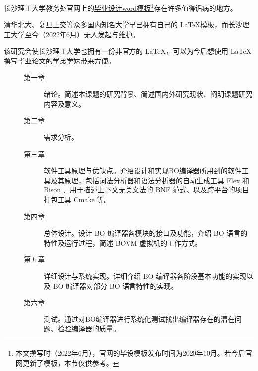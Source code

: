 
长沙理工大学教务处官网上的\href{https://www.csust.edu.cn/jwc/sjjx/bysj.htm}{毕业设计word模板}\footnote{本文撰写时（2022年6月），官网的毕设模板发布时间为2020年10月。若今后官网更新了模板，本节仅供参考。}存在许多值得诟病的地方。


清华北大、复旦上交等众多国内知名大学早已拥有自己的 \LaTeX 模板，而长沙理工大学至今（2022年6月）无人发起与维护。

该研究会使长沙理工大学也拥有一份非官方的 \LaTeX ，可以为今后想使用 \LaTeX 撰写毕业论文的学弟学妹带来方便。


\vspace{-1.5\baselineskip}
\begin{description}
    \item[\hspace{2em}]\!\!
\begin{description}
    \item[第一章] 绪论。简述本课题的研究背景、简述国内外研究现状、阐明课题研究内容及意义。
    \item[第二章] 需求分析。
    \item[第三章] 软件工具原理与优缺点。介绍设计和实现BO编译器所用到的软件工具及其原理，包括词法分析器和语法分析器的自动生成工具 Flex 和 Bison 、用于描述上下文无关文法的 BNF 范式、以及跨平台的项目打包工具 Cmake 等。
    \item[第四章] 总体设计。设计 BO 编译器各模块的接口及功能，介绍 BO 语言的特性及运行过程，简述 BOVM 虚拟机的工作方式。
    \item[第五章] 详细设计与系统实现。详细介绍 BO 编译器各阶段基本功能的实现以及 BO 编译器对部分 BO 语言特性的实现。
    \item[第六章] 测试。通过对BO编译器进行系统化测试找出编译器存在的潜在问题、检验编译器的质量。
\end{description} 
\end{description}